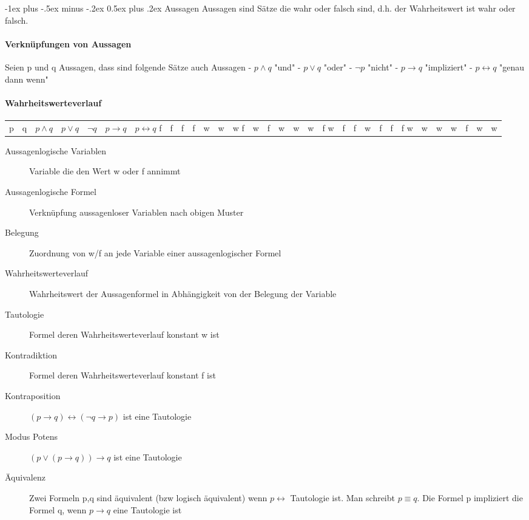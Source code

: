 \documentclass[10pt,landscape]{article}
\makeatletter
\renewcommand{\section}{\@startsection{section}{1}{0mm}%
                                {-1ex plus -.5ex minus -.2ex}%
                                {0.5ex plus .2ex}%
                                {\normalfont\large\bfseries}}
\makeatother
\begin{document}
\raggedright
\footnotesize
\begin{multicols}{3}


\setlength{\premulticols}{1pt}
\setlength{\postmulticols}{1pt}
\setlength{\multicolsep}{1pt}
\setlength{\columnsep}{2pt}

\section{Aussagen}
Aussagen sind Sätze die wahr oder falsch sind, d.h. der Wahrheitswert ist wahr oder falsch.

\paragraph{Verknüpfungen von Aussagen}
Seien p und q Aussagen, dass sind folgende Sätze auch Aussagen
- $p \wedge q$ "und"
- $p \vee q$ "oder"
- $\neg p$ "nicht"
- $p \rightarrow q$ "impliziert"
- $p \leftrightarrow q$ "genau dann wenn"

\paragraph{Wahrheitswerteverlauf}
\begin{tabular}{ l | c | c | c | c | c | c }
    p & q & $p\wedge q$ & $p\vee q$ & $\neg q$ & $p\rightarrow q$ & $p\leftrightarrow q$
    \hline
    f & f & f & f & w & w & w
    f & w & f & w & w & w & f
    w & f & f & w & f & f & f
    w & w & w & w & f & w & w
\end{tabular}

\begin{description}
    \item[Aussagenlogische Variablen] Variable die den Wert w oder f annimmt
    \item[Aussagenlogische Formel] Verknüpfung aussagenloser Variablen nach obigen Muster
    \item[Belegung] Zuordnung von w/f an jede Variable einer aussagenlogischer Formel
    \item[Wahrheitswerteverlauf] Wahrheitswert der Aussagenformel in Abhängigkeit von der Belegung der Variable
    \item[Tautologie] Formel deren Wahrheitswerteverlauf konstant w ist
    \item[Kontradiktion] Formel deren Wahrheitswerteverlauf konstant f ist
    \item[Kontraposition] $(p\rightarrow q)\leftrightarrow (\neg q \rightarrow p)$ ist eine Tautologie
    \item[Modus Potens] $(p\vee (p\rightarrow q))\rightarrow q$ ist eine Tautologie
    \item[Äquivalenz] Zwei Formeln p,q sind äquivalent (bzw logisch äquivalent) wenn $p\leftrightarrow$ Tautologie ist. Man schreibt $p \equiv q$. Die Formel p impliziert die Formel q, wenn $p\rightarrow q$ eine Tautologie ist
\end{description}


\end{multicols}
\end{document}
